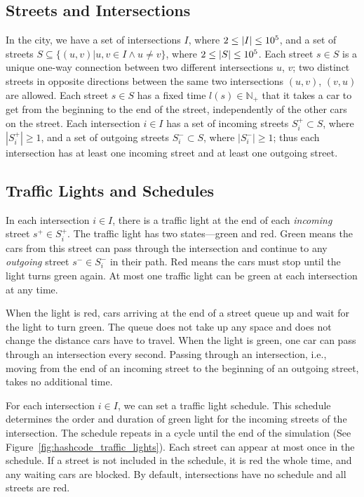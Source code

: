 \subsection{Streets and Intersections}

In the city, we have a set of intersections
$I$, where $2 \leq \left|{I}\right| \leq 10^5$,
and a set of streets
$S \subseteq \{(u, v) | u,v \in I \land u \neq v\}$, where $2 \leq \left|{S}\right| \leq 10^5$.
Each street $s \in S$ is a unique one-way connection between two different intersections $u$, $v$; two distinct streets in opposite directions between the same two intersections $(u, v)$, $(v, u)$ are allowed. Each street $s \in S$ has a fixed time $l(s) \in \mathbb{N}_+$ that it takes a car to get from the beginning to the end of the street, independently of the other cars on the street.
Each intersection $i \in I$ has a set of incoming streets $S_i^+ \subset S$, where $|S_i^+| \geq 1$, and a set of outgoing streets $S_i^- \subset S$, where $|S_i^-| \geq 1$; thus each intersection has at least one incoming street and at least one outgoing street.

\subsection{Traffic Lights and Schedules}

In each intersection $i \in I$, there is a traffic light at the end of each \textit{incoming} street $s^+ \in S_i^+$. The traffic light has two states---green and red. Green means the cars from this street can pass through the intersection and continue to any \textit{outgoing} street $s^- \in S_i^-$ in their path. Red means the cars must stop until the light turns green again. At most one traffic light can be green at each intersection at any time.

When the light is red, cars arriving at the end of a street queue up and wait for the light to turn green. The queue does not take up any space and does not change the distance cars have to travel. When the light is green, one car can pass through an intersection every second. Passing through an intersection, i.e., moving from the end of an incoming street to the beginning of an outgoing street, takes no additional time.

For each intersection $i \in I$, we can set a traffic light schedule. This schedule determines the order and duration of green light for the incoming streets of the intersection. The schedule repeats in a cycle until the end of the simulation (See Figure~\ref{fig:hashcode_traffic_lights}). Each street can appear at most once in the schedule. If a street is not included in the schedule, it is red the whole time, and any waiting cars are blocked. By default, intersections have no schedule and all streets are red.

